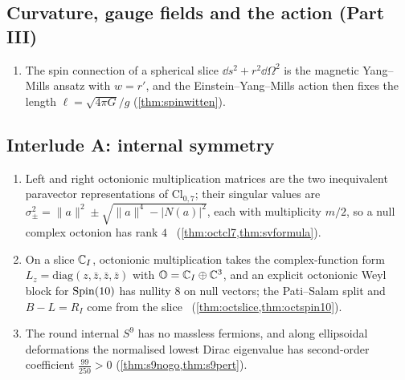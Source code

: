 \subsection*{Curvature, gauge fields and the action (Part III)}
\begin{enumerate}[label=R\arabic*.,leftmargin=*,resume]
\item The spin connection of a spherical slice $\dd s^2+r^2\dd\Omega^2$ is the magnetic Yang--Mills ansatz with $w=r'$, and the Einstein--Yang--Mills action then fixes the length $\ell=\sqrt{4\pi G}/g$ (\cref{thm:spinwitten}).
\end{enumerate}

\subsection*{Interlude A: internal symmetry}
\begin{enumerate}[label=R\arabic*.,leftmargin=*,resume]
\item Left and right octonionic multiplication matrices are the two inequivalent paravector representations of $\mathrm{Cl}_{0,7}$; their singular values are $\sigma_\pm^2=\|a\|^2\pm\sqrt{\|a\|^4-|N(a)|^2}$, each with multiplicity $m/2$, so a null complex octonion has rank $4$ \txt\ (\cref{thm:octcl7,thm:svformula}).
\item On a slice $\mathbb{C}_I$, octonionic multiplication takes the complex-function form $L_z=\mathrm{diag}(z,\bar z,\bar z,\bar z)$ with $\mathbb{O}=\mathbb{C}_I\oplus\mathbb{C}^3$, and an explicit octonionic Weyl block for $\mathrm{Spin}(10)$ has nullity $8$ on null vectors; the Pati--Salam split and $B-L=R_I$ come from the slice \txt\ (\cref{thm:octslice,thm:octspin10}).
\item The round internal $S^9$ has no massless fermions, and along ellipsoidal deformations the normalised lowest Dirac eigenvalue has second-order coefficient $\frac{99}{250}>0$ (\cref{thm:s9nogo,thm:s9pert}).
\end{enumerate}


